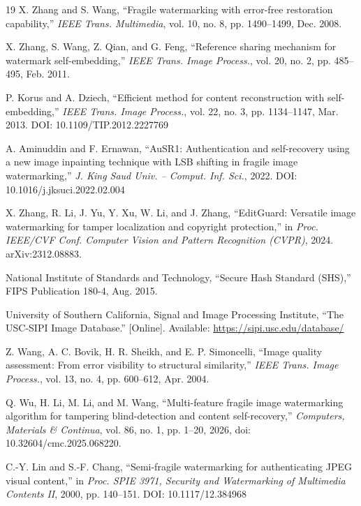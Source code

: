 \documentclass[conference]{IEEEtran}
\begin{document}
\begin{thebibliography}{19}
 X. Zhang and S. Wang, ``Fragile watermarking with error-free restoration capability,'' \emph{IEEE Trans. Multimedia}, vol. 10, no. 8, pp. 1490--1499, Dec. 2008.

 X. Zhang, S. Wang, Z. Qian, and G. Feng, ``Reference sharing mechanism for watermark self-embedding,'' \emph{IEEE Trans. Image Process.}, vol. 20, no. 2, pp. 485--495, Feb. 2011.

 P. Korus and A. Dziech, ``Efficient method for content reconstruction with self-embedding,'' \emph{IEEE Trans. Image Process.}, vol. 22, no. 3, pp. 1134--1147, Mar. 2013. DOI: 10.1109/TIP.2012.2227769

 A. Aminuddin and F. Ernawan, ``AuSR1: Authentication and self-recovery using a new image inpainting technique with LSB shifting in fragile image watermarking,'' \emph{J. King Saud Univ. -- Comput. Inf. Sci.}, 2022. DOI: 10.1016/j.jksuci.2022.02.004

 X. Zhang, R. Li, J. Yu, Y. Xu, W. Li, and J. Zhang, ``EditGuard: Versatile image watermarking for tamper localization and copyright protection,'' in \emph{Proc. IEEE/CVF Conf. Computer Vision and Pattern Recognition (CVPR)}, 2024. arXiv:2312.08883.


 National Institute of Standards and Technology, ``Secure Hash Standard (SHS),'' FIPS Publication 180-4, Aug. 2015.

 University of Southern California, Signal and Image Processing Institute, ``The USC-SIPI Image Database.'' [Online]. Available: \url{https://sipi.usc.edu/database/}

 Z. Wang, A. C. Bovik, H. R. Sheikh, and E. P. Simoncelli, ``Image quality assessment: From error visibility to structural similarity,'' \emph{IEEE Trans. Image Process.}, vol. 13, no. 4, pp. 600--612, Apr. 2004.

 Q. Wu, H. Li, M. Li, and M. Wang, ``Multi-feature fragile image watermarking algorithm for tampering blind-detection and content self-recovery,'' \emph{Computers, Materials \& Continua}, vol. 86, no. 1, pp. 1--20, 2026, doi: 10.32604/cmc.2025.068220.

 C.-Y. Lin and S.-F. Chang, ``Semi-fragile watermarking for authenticating JPEG visual content,'' in \emph{Proc. SPIE 3971, Security and Watermarking of Multimedia Contents II}, 2000, pp. 140--151. DOI: 10.1117/12.384968

\end{thebibliography}
\end{document}
